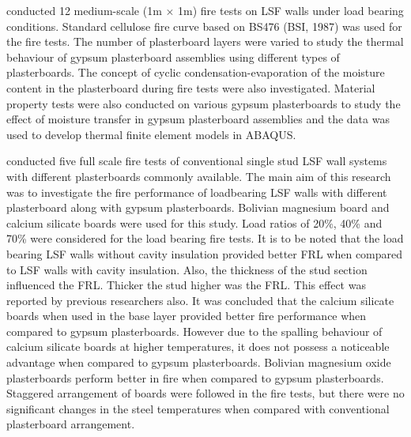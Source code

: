 \citet{Rahmanian2011} conducted 12 medium-scale (1m $\times$ 1m) fire tests on LSF walls under load bearing conditions. Standard cellulose fire curve based on BS476 (BSI, 1987) was used for the fire tests. The number of plasterboard layers were varied to study the thermal behaviour of gypsum plasterboard assemblies using different types of plasterboards. The concept of cyclic condensation-evaporation of the moisture content in the plasterboard during fire tests were also investigated. Material property tests were also conducted on various gypsum plasterboards to study the effect of moisture transfer in gypsum plasterboard assemblies and the data was used to develop thermal finite element models in ABAQUS. 

\citet{Chen2012a} conducted five full scale fire tests of conventional single stud LSF wall systems with different plasterboards commonly available. The main aim of this research was to investigate the fire performance of loadbearing LSF walls with different plasterboard along with gypsum plasterboards. Bolivian magnesium board and calcium silicate boards were used for this study. Load ratios of 20\%, 40\% and 70\% were considered for the load bearing fire tests. It is to be noted that the load bearing LSF walls without cavity insulation provided better FRL when compared to LSF walls with cavity insulation. Also, the thickness of the stud section influenced the FRL. Thicker the stud higher was the FRL. This effect was reported by previous researchers also. It was concluded that the calcium silicate boards when used in the base layer provided better fire performance when compared to gypsum plasterboards. However due to the spalling behaviour of calcium silicate boards at higher temperatures, it does not possess a noticeable advantage when compared to gypsum plasterboards. Bolivian magnesium oxide plasterboards perform better in fire when compared to gypsum plasterboards. Staggered arrangement of boards were followed in the fire tests, but there were no significant changes in the steel temperatures when compared with conventional plasterboard arrangement. 

